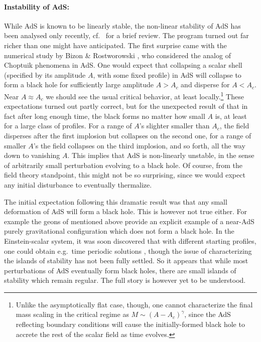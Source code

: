\documentclass[12pt,a4paper]{article}
\begin{document}
\paragraph{Instability of AdS:}  %
While AdS is known to be linearly stable, the non-linear stability of AdS has been analysed only recently, cf.\ \cite{Horowitz:2014hja} for a brief review.  
The program turned out far richer than one might have anticipated.  The first surprise came with the numerical study by Bizon \& Rostworowski \cite{Bizon:2011gg}, who considered the analog of Choptuik phenomena in AdS.  One would expect that collapsing a scalar shell (specified by its amplitude $A$, with some fixed profile) in AdS will collapse to form a black hole for sufficiently large amplitude $A>A_c$  and disperse for  $A<A_c$.  Near $A \approx A_c$ we should see the usual critical behavior, at least locally.\footnote{
  Unlike the asymptotically flat case, though, one cannot characterize the final mass scaling in the critical regime as $M\sim (A-A_c)^\gamma$, since the AdS reflecting boundary conditions will cause the  initially-formed black hole to accrete the rest of the scalar field as time evolves.
}
These expectations turned out partly correct, but for the unexpected result of \cite{Bizon:2011gg} that in fact after long enough time, the black forms no matter how small $A$ is, at least for a large class of profiles.  For a range of $A$'s slighter smaller than $A_c$, the field disperses after the first implosion but collapses on the second one, for a range of smaller $A$'s the field collapses on the third implosion, and so forth, all the way down to vanishing $A$.  This implies that AdS is non-linearly unstable, in the sense of arbitrarily small perturbation evolving to a black hole.   Of course, from the field theory standpoint, this might not be so surprising, since we would expect any initial disturbance to eventually thermalize. 

 The initial expectation following this dramatic result was that any small deformation of AdS will form a black hole.  This is however not true either.   For example the geons of \cite{Dias:2011at} mentioned above provide an explicit example of a near-AdS purely gravitational configuration which does not form a black hole.  In the Einstein-scalar system, it was soon discovered that with different starting profiles, one could obtain e.g.\ time periodic solutions \cite{Maliborski:2013jca}, though the issue of characterizing the islands of stability has not been fully settled.   So it appears that while most perturbations of AdS eventually form black holes, there are small islands of stability which remain regular.  The full story is however yet to be understood.  
\end{document}
